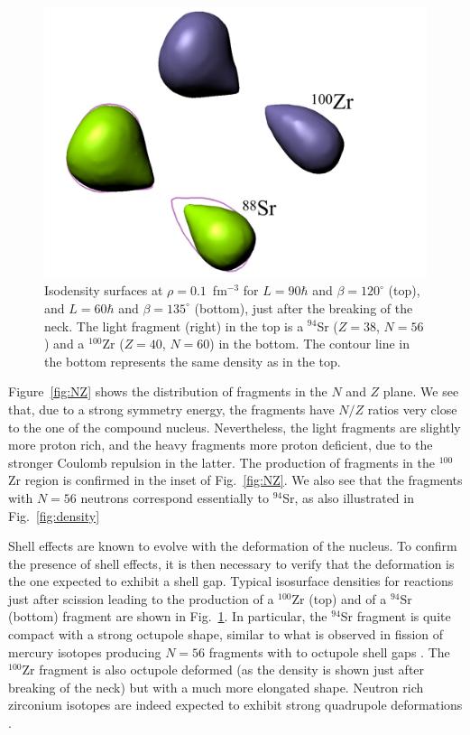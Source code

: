 \begin{figure}
	\centerline{\includegraphics*[width=\textwidth]{../Figures/CaBk/shapes.pdf}}
	\caption{Isodensity surfaces at $\rho=0.1$~fm$^{-3}$ for $L=90\hbar$ and $\beta=120^{\circ}$ (top), and $L=60\hbar$ and $\beta=135^{\circ}$ (bottom), just after the breaking of the neck. The light fragment (right) in the top is a $^{94}$Sr ($Z=38$, $N=56$) and a $^{100}$Zr ($Z=40$, $N=60$) in the bottom. The contour line in the bottom represents the same density as in the top. }
	\label{fig:shapes}
\end{figure}

Figure~\ref{fig:NZ}  shows the distribution of fragments in the $N$ and $Z$ plane.
We see that, due to a strong symmetry energy, the fragments have $N/Z$ ratios very close to the one of the compound nucleus.
Nevertheless, the light fragments are slightly more proton rich, and the heavy fragments more proton deficient, due to the stronger Coulomb repulsion in the latter.
The production of fragments in the $^{100}$Zr region is confirmed in the inset of Fig.~\ref{fig:NZ}. We also see that the fragments with $N=56$ neutrons correspond essentially to $^{94}$Sr, as also illustrated in Fig.~\ref{fig:density}

Shell effects are known to evolve with the deformation of the nucleus.
To confirm the presence of shell effects, it is then necessary to verify that the deformation is the one expected to exhibit a shell gap.
Typical isosurface densities for reactions just after scission leading to the production of a $^{100}$Zr (top) and of a $^{94}$Sr (bottom) fragment are shown in Fig.~\ref{fig:shapes}.
In particular, the $^{94}$Sr fragment is quite compact with a strong octupole shape, similar to what is observed in fission of mercury isotopes producing $N=56$ fragments with to octupole shell gaps \citep{scamps2019}.
The $^{100}$Zr fragment is also octupole deformed (as the density is shown just after breaking of the neck) but with a much more elongated shape.
Neutron rich zirconium isotopes are indeed expected to exhibit strong quadrupole deformations \citep{lalazissis1999,blazkiewicz2005,hwang2006}.


